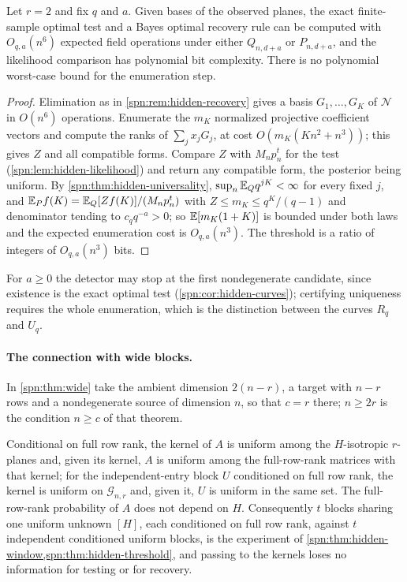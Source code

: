 \begin{proposition}\label{spn:prop:hidden-algorithm}
Let $r=2$ and fix $q$ and $a$. Given bases of the observed planes, the exact finite-sample optimal
test and a Bayes optimal recovery rule can be computed with $O_{q,a}(n^6)$ expected field operations
under either $Q_{n,d+a}$ or $P_{n,d+a}$, and the likelihood comparison has polynomial bit complexity.
There is no polynomial worst-case bound for the enumeration step.
\end{proposition}

\begin{proof}
Elimination as in \cref{spn:rem:hidden-recovery} gives a basis $G_1,\dots,G_K$ of $\mathcal N$ in
$O(n^6)$ operations. Enumerate the $m_K$ normalized projective coefficient vectors and compute the
ranks of $\sum_jx_jG_j$, at cost $O(m_K(Kn^2+n^3))$; this gives $Z$ and all compatible forms. Compare
$Z$ with $M_np_n^t$ for the test (\cref{spn:lem:hidden-likelihood}) and return any compatible form,
the posterior being uniform. By \cref{spn:thm:hidden-universality}, $\sup_n\mathbb{E}_Qq^{jK}<\infty$ for
every fixed $j$, and $\mathbb{E}_Pf(K)=\mathbb{E}_Q[Zf(K)]/(M_np_n^t)$ with $Z\le m_K\le q^K/(q-1)$ and
denominator tending to $c_qq^{-a}>0$; so $\mathbb{E}[m_K(1+K)]$ is bounded under both laws and the expected
enumeration cost is $O_{q,a}(n^3)$. The threshold is a ratio of integers of $O_{q,a}(n^3)$ bits.
\end{proof}

For $a\ge0$ the detector may stop at the first nondegenerate candidate, since existence is the exact
optimal test (\cref{spn:cor:hidden-curves}); certifying uniqueness requires the whole enumeration,
which is the distinction between the curves $R_q$ and $U_q$.

\paragraph{The connection with wide blocks.}
In \cref{spn:thm:wide} take the ambient dimension $2(n-r)$, a target with $n-r$ rows and a
nondegenerate source of dimension $n$, so that $c=r$ there; $n\ge2r$ is the condition $n\ge c$ of
that theorem.

\begin{proposition}\label{spn:prop:hidden-wide}
Conditional on full row rank, the kernel of $A$ is uniform among the $H$-isotropic $r$-planes and,
given its kernel, $A$ is uniform among the full-row-rank matrices with that kernel; for the
independent-entry block $U$ conditioned on full row rank, the kernel is uniform on $\mathcal G_{n,r}$
and, given it, $U$ is uniform in the same set. The full-row-rank probability of $A$ does not depend
on $H$. Consequently $t$ blocks sharing one uniform unknown $[H]$, each conditioned on full row
rank, against $t$ independent conditioned uniform blocks, is the experiment of
\cref{spn:thm:hidden-window,spn:thm:hidden-threshold}, and passing to the kernels loses no
information for testing or for recovery.
\end{proposition}

